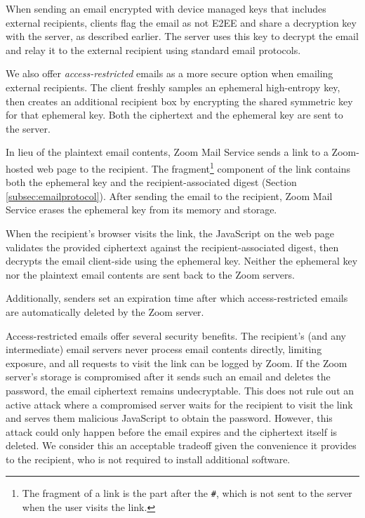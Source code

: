 When sending an email encrypted with device managed keys that includes external recipients, clients
flag the email as not E2EE and share a decryption key with the server, as described earlier. The
server uses this key to decrypt the email and relay it to the external recipient using standard
email protocols.

We also offer \emph{access-restricted} emails as a more secure option when emailing external
recipients. The client freshly samples an ephemeral high-entropy key, then creates an additional
recipient box by encrypting the shared symmetric key for that ephemeral key. Both the ciphertext and
the ephemeral key are sent to the server.

In lieu of the plaintext email contents, Zoom Mail Service sends a link to a Zoom-hosted web page to
the recipient. The fragment\footnote{The fragment of a link is the part after the \texttt{\#}, which
is not sent to the server when the user visits the link.} component of the link contains both the
ephemeral key and the recipient-associated digest (Section \ref{subsec:emailprotocol}). After
sending the email to the recipient, Zoom Mail Service erases the ephemeral key from its memory and
storage.

When the recipient's browser visits the link, the JavaScript on the web page validates the provided
ciphertext against the recipient-associated digest, then decrypts the email client-side using the
ephemeral key. Neither the ephemeral key nor the plaintext email contents are sent back to the Zoom
servers. 

Additionally, senders set an expiration time after which access-restricted emails are automatically
deleted by the Zoom server.

Access-restricted emails offer several security benefits. The recipient's (and any intermediate)
email servers never process email contents directly, limiting exposure, and all requests to visit
the link can be logged by Zoom. If the Zoom server's storage is compromised after it sends such an
email and deletes the password, the email ciphertext remains undecryptable. This does not rule out
an active attack where a compromised server waits for the recipient to visit the link and serves
them malicious JavaScript to obtain the password. However, this attack could only happen before the
email expires and the ciphertext itself is deleted. We consider this an acceptable tradeoff given
the convenience it provides to the recipient, who is not required to install additional software.

